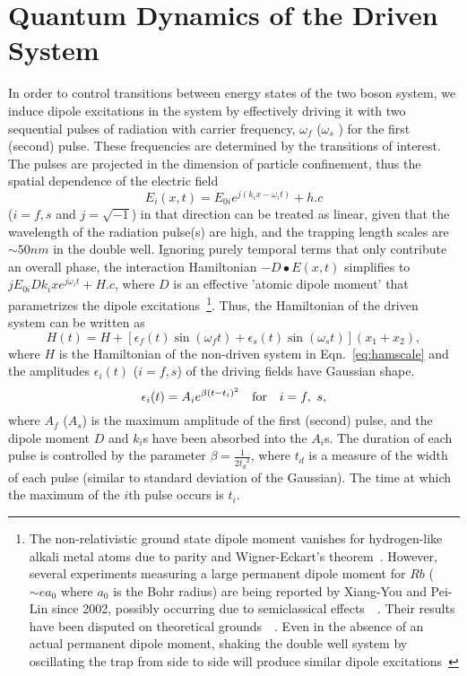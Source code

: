 \section{\label{sec:5} Quantum Dynamics of the Driven System}
\label{chapter-dblwell:section:qdynamics}
%
%
In order to control transitions between energy states of the two boson system, we induce dipole excitations in the system by effectively driving it
with  two sequential pulses of radiation with carrier frequency, ${\omega}_f$ (${\omega}_s$ ) for the first  (second)  pulse. These frequencies are determined by the transitions of interest. The pulses are projected in the dimension of particle confinement, thus the spatial dependence of the electric field
\begin{equation}
E_i(x,t) = E_{0i} e^{j(k_ix-\omega_it)} + h.c
\end{equation}
($i=f,s$ and $j=\sqrt{-1}$) in that direction can be treated as linear, given that the wavelength of the radiation pulse(s) are high, and the trapping length scales are $\sim 50 nm$ in the double well. Ignoring purely temporal terms that only contribute an overall phase, the interaction Hamiltonian $- D\bullet E(x,t)$ simplifies to $jE_{0i}Dk_i x e^{j\omega_i t} + H.c$, where $D$ is an effective 'atomic dipole moment' that parametrizes the dipole excitations~\footnote{The non-relativistic ground state dipole moment vanishes for hydrogen-like alkali metal atoms due to parity and Wigner-Eckart's theorem~\cite{sakurai}. However, several experiments measuring a large permanent dipole moment for $Rb$ ($\sim e a_0$ where $a_0$ is the Bohr radius) are being reported by Xiang-You and Pei-Lin since 2002, possibly occurring due to semiclassical effects~\cite{rb:dipole}~\cite{rb:dipole:more}. Their results have been disputed on theoretical grounds~\cite{rb:dipole:disputed}~\cite{rb:dipole:reply2dispute}. Even in the absence of an actual permanent dipole moment, shaking the double well system by oscillating the trap from side to side will produce similar dipole excitations~\cite{murphy:similartomine}}. Thus, the Hamiltonian of the driven system can be written as
%
\begin{equation}
H(t)=H+[\epsilon_f(t)\sin(\omega_ft)+\epsilon_s(t)\sin(\omega_st)](x_1+x_2),
\label{eq:drivham}
\end{equation}
%
where $H$ is the Hamiltonian of the non-driven system in Eqn.~\eqref{eq:hamscale} and the amplitudes $\epsilon_i(t)$ ($i=f,s$) of the driving fields have Gaussian shape. 
%
\begin{equation}
\epsilon_{i}(t)= A_i e^{{\beta}(t-t_{i})^2}~~~{\rm for}~~~i=f,~s,
\label{eq:drivensystem}
\end{equation}
%
where $A_{f}$ ($A_s$) is the maximum amplitude of the first (second) pulse, and the dipole moment $D$ and $k_i$s have been absorbed into the $A_i$s. The duration of each 
pulse is controlled by the parameter $\beta=\frac{1}{2{t_d}^2}$, where ${t_d}$ is a measure of the width of each pulse (similar to standard deviation of the Gaussian). 
The time at which the maximum of the $i$th  pulse occurs is $t_i$. 

